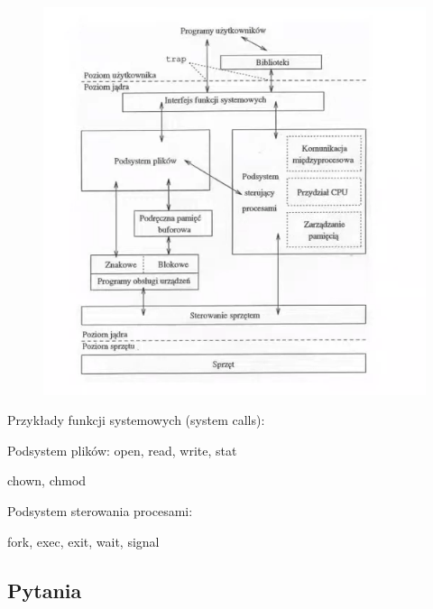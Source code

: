 \documentclass[11pt]{article}
\begin{document}
\begin{figure}[H]
    \centering
    \includegraphics[width=0.5\linewidth]{./img/so1-03.png}
\end{figure}

Przykłady funkcji systemowych (system calls):

Podsystem plików:
open, read, write, stat

chown, chmod

Podsystem sterowania procesami:

fork, exec, exit, wait, signal

\subsection{Pytania}
\end{document}
